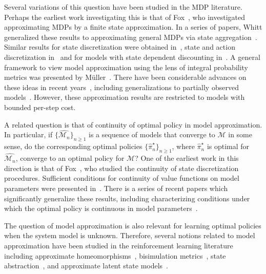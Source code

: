 \documentclass[letterpaper, 10pt]{IEEEtran}
\newcommand*\ALPHABET{\mathcal}
\begin{document}
Several variations of this question have been studied in the MDP literature. Perhaps the earliest work investigating this is that of Fox~\cite{fox1971finite}, who investigated approximating MDPs by a finite state approximation. In a series of papers, Whitt generalized these results to approximating general MDPs via state aggregation~\cite{whitt1978,whitt1979,whitt1980}. Similar results for state discretization were obtained in~\cite{bertsekas1975convergence,chow1991optimal}, state and action discretization in~\cite{dufour2012approximation} and for models with state dependent discounting in~\cite{haurie1986approximation}. A general framework to view model approximation using the lens of integral probability metrics was presented by M\"uller~\cite{muller1997}.  There have been considerable  advances on these ideas in recent years~\cite{saldi2014asymptotic,saldi2017asymptotic,saldi2018finite}, including generalizations to partially observed models~\cite{kara2022near,AIS}. However, these approximation results are restricted to models with bounded per-step cost. 

A related question is that of continuity of optimal policy in model approximation. In particular, if $\{ \hat{\ALPHABET M_n} \}_{n\geq1}$ is a sequence of models that converge to $\ALPHABET M$ in some sense, do the corresponding optimal policies $\{\hat\pi_{n}^\star \}_{n\geq1}$, where $\hat\pi_n^{\star}$ is optimal for $\hat{\ALPHABET M_n}$, converge to an optimal policy for $\ALPHABET M$? One of the earliest work in this direction is that of Fox~\cite{fox1973discretizing}, who studied the continuity of state discretization procedures. Sufficient conditions for continuity of value functions on model parameters were presented in~\cite{dutta1994parametric}. There is a series of recent papers which significantly generalize these results, including characterizing conditions under which the optimal policy is continuous in model parameters~\cite{saldi2014asymptotic,saldi2016near,saldi2018finite,saldi2017asymptotic,saldi2019asymptotic,kara2019robustness,kara2020robustness,kara2022robustness}. 

The question of model approximation is also relevant for learning optimal policies when the system model is unknown. Therefore, several notions related to model approximation have been studied in the reinforcement learning literature including
approximate homeomorphisms~\cite{ravindran2004approximate,van2020plannable},
bisimulation metrics~\cite{ferns2004metrics,ferns2011bisimulation,castro2009equivalence},
state abstraction~\cite{abel2016near},
and approximate latent state models~\cite{franccois2019overfitting,gelada2019deepmdp}.
\end{document}
